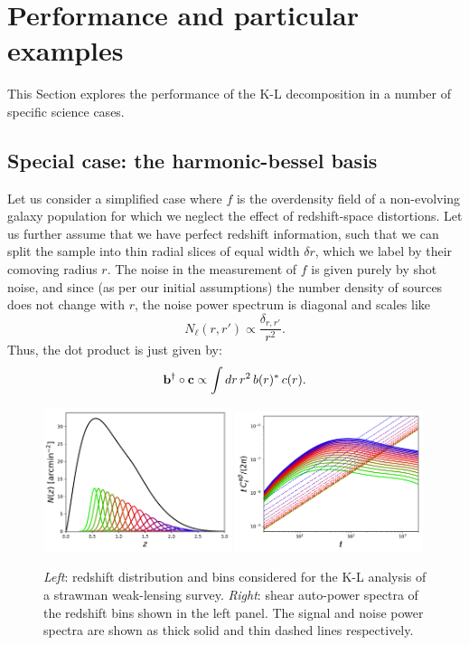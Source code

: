 \documentclass[twocolumn,amsfont,amssymb,amsmath, showpacs,balancelastpage, nofootinbib]{revtex4-1}
\begin{document}
\section{Performance and particular examples}\label{sec:results}
  This Section explores the performance of the K-L decomposition in a number of specific science cases.
  
  \subsection{Special case: the harmonic-bessel basis}\label{ssec:results.bessel}
    Let us consider a simplified case where $f$ is the overdensity field of a non-evolving galaxy population for which we neglect the effect of redshift-space distortions. Let us further assume that we have perfect redshift information, such that we can split the sample into thin radial slices of equal width $\delta r$, which we label by their comoving radius $r$. The noise in the measurement of $f$ is given purely by shot noise, and since (as per our initial assumptions) the number density of sources does not change with $r$, the noise power spectrum is diagonal and scales like 
    \begin{equation}
      N_\ell(r,r')\propto \frac{\delta_{r,r'}}{r^2}.
    \end{equation}
    Thus, the dot product is just given by:
    \begin{equation}
      {\bf b}^\dag\circ{\bf c}\propto\int dr\,r^2\,b(r)^*\,c(r).
    \end{equation}
    \begin{figure}
      \centering
      \includegraphics[width=0.49\textwidth]{Figs/nz_lsst_wl}
      \includegraphics[width=0.49\textwidth]{Figs/c_ij_wl}
      \caption{{\sl Left}: redshift distribution and bins considered for the K-L analysis of a strawman weak-lensing survey. {\sl Right}: shear auto-power spectra of the redshift bins shown in the left panel. The signal and noise power spectra are shown as thick solid and thin dashed lines respectively.}\label{fig:nz_wl}
    \end{figure}
   
\end{document}
